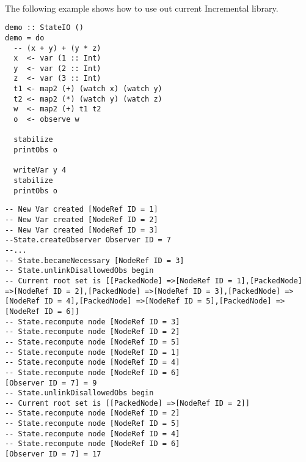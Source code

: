 \documentclass[a4paper, twocolumn]{article}
\begin{document}
\paragraph{} The following example shows how to use out current Incremental library.

\begin{lstlisting}[caption=Example, label={lst:demo}]
demo :: StateIO ()
demo = do
  -- (x + y) + (y * z)
  x  <- var (1 :: Int)
  y  <- var (2 :: Int)
  z  <- var (3 :: Int)
  t1 <- map2 (+) (watch x) (watch y)
  t2 <- map2 (*) (watch y) (watch z)
  w  <- map2 (+) t1 t2
  o  <- observe w

  stabilize
  printObs o

  writeVar y 4
  stabilize
  printObs o
\end{lstlisting}

\begin{lstlisting}[caption=Output of demo, label={lst:output}]
-- New Var created [NodeRef ID = 1]
-- New Var created [NodeRef ID = 2]
-- New Var created [NodeRef ID = 3]
--State.createObserver Observer ID = 7
--...
-- State.becameNecessary [NodeRef ID = 3]
-- State.unlinkDisallowedObs begin
-- Current root set is [[PackedNode] =>[NodeRef ID = 1],[PackedNode] =>[NodeRef ID = 2],[PackedNode] =>[NodeRef ID = 3],[PackedNode] =>[NodeRef ID = 4],[PackedNode] =>[NodeRef ID = 5],[PackedNode] =>[NodeRef ID = 6]]
-- State.recompute node [NodeRef ID = 3]
-- State.recompute node [NodeRef ID = 2]
-- State.recompute node [NodeRef ID = 5]
-- State.recompute node [NodeRef ID = 1]
-- State.recompute node [NodeRef ID = 4]
-- State.recompute node [NodeRef ID = 6]
[Observer ID = 7] = 9
-- State.unlinkDisallowedObs begin
-- Current root set is [[PackedNode] =>[NodeRef ID = 2]]
-- State.recompute node [NodeRef ID = 2]
-- State.recompute node [NodeRef ID = 5]
-- State.recompute node [NodeRef ID = 4]
-- State.recompute node [NodeRef ID = 6]
[Observer ID = 7] = 17
\end{lstlisting}
\end{document}
